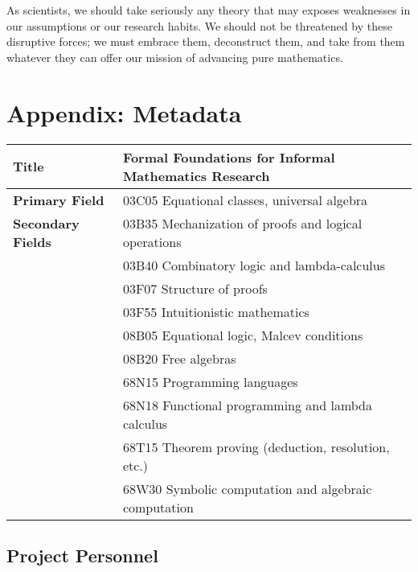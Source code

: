 \documentclass[12pt]{amsart}  %
\begin{document}
As scientists, we should take seriously any theory that 
may exposes weaknesses in our assumptions or our research habits.  We should
not be threatened by these disruptive forces; we must embrace them, deconstruct them,
and take from them whatever they can offer our mission of advancing pure mathematics.


\newpage


\appendix

\section{Appendix: Metadata}

\begin{tabular}{|l|l|}
\hline
{\bf Title} & Formal Foundations for Informal Mathematics Research \\
\hline
{\bf Primary Field} & 03C05 Equational classes, universal algebra\\ %
\hline
{\bf Secondary Fields} & 
03B35 Mechanization of proofs and logical operations\\ %
& 03B40 Combinatory logic and lambda-calculus\\ %
& 03F07  Structure of proofs\\
& 03F55  Intuitionistic mathematics\\
& 08B05 Equational logic, Malcev conditions\\
& 08B20  Free algebras\\
& 68N15  Programming languages\\
& 68N18  Functional programming and lambda calculus \\ %
& 68T15  Theorem proving (deduction, resolution, etc.)\\
& 68W30  Symbolic computation and algebraic computation\\
\hline
\end{tabular}

\vskip1cm

\subsection{Project Personnel}\
\end{document}

